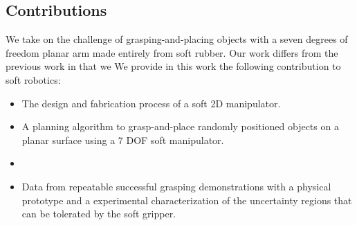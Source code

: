 \subsection{Contributions}
We take on the challenge of grasping-and-placing objects with a seven degrees of freedom planar arm made entirely from soft rubber. 
Our work differs from the previous work in that we  
We provide in this work the following contribution to soft robotics:
\begin{itemize}
  \item The design and fabrication process of a soft 2D manipulator.
  \item A planning algorithm to grasp-and-place randomly positioned objects on a planar surface using a 7 DOF soft manipulator.  
  \item {}   
   \item Data from repeatable successful grasping demonstrations with a physical prototype and a  experimental characterization of the uncertainty regions that can be tolerated by the soft gripper.
\end{itemize}

